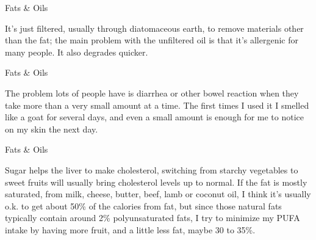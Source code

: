 \documentclass[11pt,oneside,openany,extrafontsizes]{memoir}
\begin{document}
\begin{standalonequote}{Fats \& Oils}

    \begin{answer}
        It's just filtered, usually through diatomaceous earth, to remove materials other than the fat; the main problem with the unfiltered oil is that it's allergenic for many people. It also degrades quicker.
    \end{answer}
\end{standalonequote}

\begin{standalonequote}{Fats \& Oils}

    \begin{answer}
        The problem lots of people have is diarrhea or other bowel reaction when they take more than a very small amount at a time. The first times I used it I smelled like a goat for several days, and even a small amount is enough for me to notice on my skin the next day.
    \end{answer}
\end{standalonequote}

\begin{standalonequote}{Fats \& Oils}

    \begin{answer}
        Sugar helps the liver to make cholesterol, switching from starchy vegetables to sweet fruits will usually bring cholesterol levels up to normal. If the fat is mostly saturated, from milk, cheese, butter, beef, lamb or coconut oil, I think it's usually o.k. to get about 50\% of the calories from fat, but since those natural fats typically contain around 2\% polyunsaturated fats, I try to minimize my PUFA intake by having more fruit, and a little less fat, maybe 30 to 35\%.
    \end{answer}
\end{standalonequote}
\end{document}
